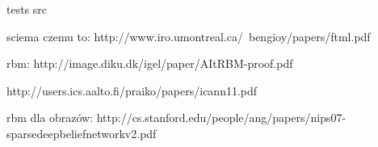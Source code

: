 tests
src

sciema czemu to:
http://www.iro.umontreal.ca/~bengioy/papers/ftml.pdf

rbm:
http://image.diku.dk/igel/paper/AItRBM-proof.pdf

http://users.ics.aalto.fi/praiko/papers/icann11.pdf

rbm dla obrazów:
http://cs.stanford.edu/people/ang/papers/nips07-sparsedeepbeliefnetworkv2.pdf

